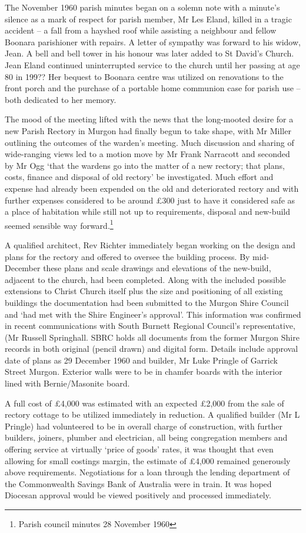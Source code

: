 The November 1960 parish minutes began on a solemn note with a minute's
silence as a mark of respect for parish member, Mr Les Eland, killed in
a tragic accident -- a fall from a hayshed roof while assisting a
neighbour and fellow Boonara parishioner with repairs. A letter of
sympathy was forward to his widow, Jean. A bell and bell tower in his
honour was later added to St David's Church. Jean Eland continued
uninterrupted service to the church until her passing at age 80 in 199??
Her bequest to Boonara centre was utilized on renovations to the front
porch and the purchase of a portable home communion case for parish use
-- both dedicated to her memory.

The mood of the meeting lifted with the news that the long-mooted desire
for a new Parish Rectory in Murgon had finally begun to take shape, with
Mr Miller outlining the outcomes of the warden's meeting. Much
discussion and sharing of wide-ranging views led to a motion move by Mr
Frank Narracott and seconded by Mr Ogg `that the wardens go into the
matter of a new rectory; that plans, costs, finance and disposal of old
rectory' be investigated. Much effort and expense had already been
expended on the old and deteriorated rectory and with further expenses
considered to be around \pounds300 just to have it considered safe as a place
of habitation while still not up to requirements, disposal and new-build
seemed sensible way forward.\footnote{Parish council minutes 28 November
  1960}

A qualified architect, Rev Richter immediately began working on the
design and plans for the rectory and offered to oversee the building
process. By mid-December these plans and scale drawings and elevations
of the new-build, adjacent to the church, had been completed. Along with
the included possible extensions to Christ Church itself plus the size
and positioning of all existing buildings the documentation had been
submitted to the Murgon Shire Council and `had met with the Shire
Engineer's approval'. This information was confirmed in recent
communications with South Burnett Regional Council's representative, (Mr
Russell Springhall. SBRC holds all documents from the former Murgon
Shire records in both original (pencil drawn) and digital form. Details
include approval date of plans as 29 December 1960 and builder, Mr Luke
Pringle of Garrick Street Murgon. Exterior walls were to be in chamfer
boards with the interior lined with Bernie/Masonite board.

A full cost of \pounds4,000 was estimated with an expected \pounds2,000 from the
sale of rectory cottage to be utilized immediately in reduction. A
qualified builder (Mr L Pringle) had volunteered to be in overall charge
of construction, with further builders, joiners, plumber and
electrician, all being congregation members and offering service at
virtually `price of goods' rates, it was thought that even allowing for
small costings margin, the estimate of \pounds4,000 remained generously above
requirements. Negotiations for a loan through the lending department of
the Commonwealth Savings Bank of Australia were in train. It was hoped
Diocesan approval would be viewed positively and processed immediately.

